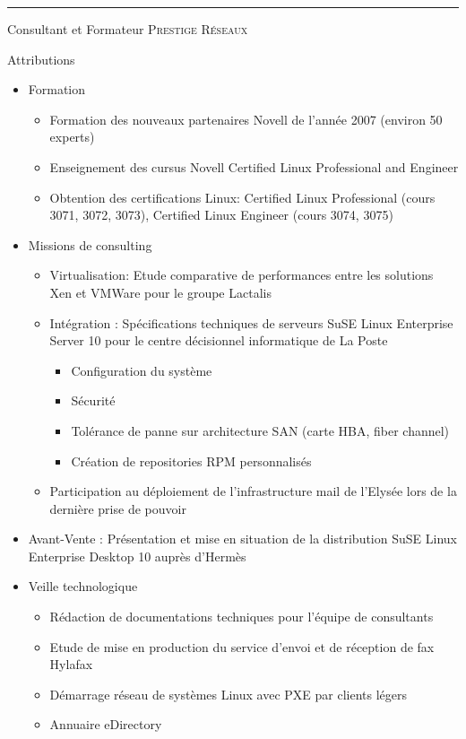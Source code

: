 \documentclass[a4paper,10pt]{article}
\begin{document}
\bigskip
\hrule
\bigskip
\newpage

\par{\centering\Large \hypertarget{prestige}{Consultant et Formateur \textsc{Prestige Réseaux}}\par}\large{\centering Attributions\par}\normalsize

\begin{itemize}
\item Formation
	\begin{itemize}
	\item Formation des nouveaux partenaires Novell de l’année 2007 (environ 50 experts)
	\item Enseignement des cursus Novell Certiﬁed Linux Professional and Engineer
	\item Obtention des certiﬁcations Linux: Certiﬁed Linux Professional (cours 3071, 3072, 3073), Certiﬁed Linux Engineer (cours 3074, 3075)
 	\end{itemize}
\item Missions de consulting
	\begin{itemize}
	\item Virtualisation: Etude comparative de performances entre les solutions Xen et VMWare pour le groupe Lactalis
	\item Intégration : Spécifications techniques de serveurs SuSE Linux Enterprise Server 10 pour le centre décisionnel informatique de La Poste
		\begin{itemize}
		\item Conﬁguration du système
		\item Sécurité
		\item Tolérance de panne sur architecture SAN (carte HBA, ﬁber channel)
		\item Création de repositories RPM personnalisés
		\end{itemize}
	\item Participation au déploiement de l’infrastructure mail de l’Elysée lors de la dernière prise de pouvoir
 	\end{itemize}
\item Avant-Vente : Présentation et mise en situation de la distribution SuSE Linux Enterprise Desktop 10 auprès d’Hermès
 
\item Veille technologique
	\begin{itemize}
	\item Rédaction de documentations techniques pour l’équipe de consultants
	\item Etude de mise en production du service d’envoi et de réception de fax Hylafax
	\item Démarrage réseau de systèmes Linux avec PXE par clients légers
	\item Annuaire eDirectory
	\end{itemize}
\end{itemize}
\end{document}

